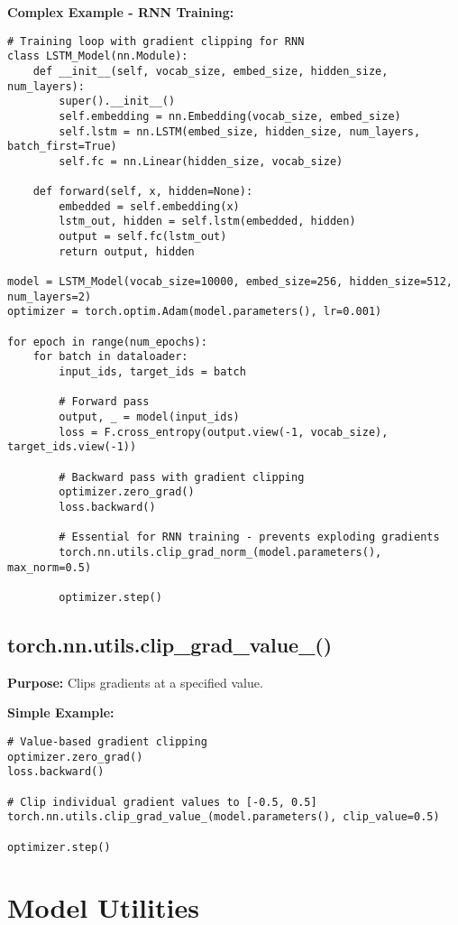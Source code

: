 \documentclass[11pt,a4paper]{book}
\begin{document}
\textbf{Complex Example - RNN Training:}
\begin{verbatim}
# Training loop with gradient clipping for RNN
class LSTM_Model(nn.Module):
    def __init__(self, vocab_size, embed_size, hidden_size, num_layers):
        super().__init__()
        self.embedding = nn.Embedding(vocab_size, embed_size)
        self.lstm = nn.LSTM(embed_size, hidden_size, num_layers, batch_first=True)
        self.fc = nn.Linear(hidden_size, vocab_size)
        
    def forward(self, x, hidden=None):
        embedded = self.embedding(x)
        lstm_out, hidden = self.lstm(embedded, hidden)
        output = self.fc(lstm_out)
        return output, hidden

model = LSTM_Model(vocab_size=10000, embed_size=256, hidden_size=512, num_layers=2)
optimizer = torch.optim.Adam(model.parameters(), lr=0.001)

for epoch in range(num_epochs):
    for batch in dataloader:
        input_ids, target_ids = batch
        
        # Forward pass
        output, _ = model(input_ids)
        loss = F.cross_entropy(output.view(-1, vocab_size), target_ids.view(-1))
        
        # Backward pass with gradient clipping
        optimizer.zero_grad()
        loss.backward()
        
        # Essential for RNN training - prevents exploding gradients
        torch.nn.utils.clip_grad_norm_(model.parameters(), max_norm=0.5)
        
        optimizer.step()
\end{verbatim}

\subsection{torch.nn.utils.clip\_grad\_value\_()}

\textbf{Purpose:} Clips gradients at a specified value.

\textbf{Simple Example:}
\begin{verbatim}
# Value-based gradient clipping
optimizer.zero_grad()
loss.backward()

# Clip individual gradient values to [-0.5, 0.5]
torch.nn.utils.clip_grad_value_(model.parameters(), clip_value=0.5)

optimizer.step()
\end{verbatim}

\section{Model Utilities}
\end{document}
